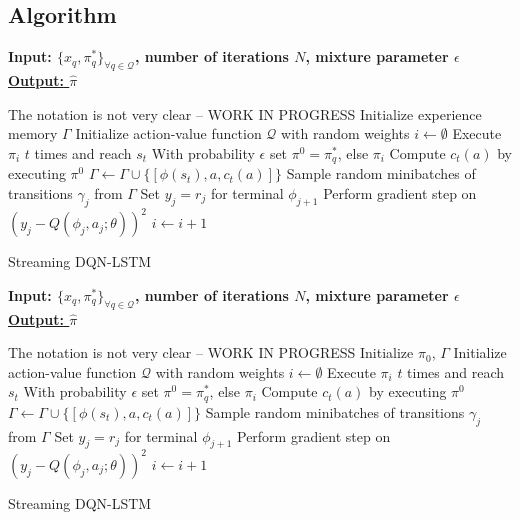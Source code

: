 \documentclass[12pt]{article}
\begin{document}
\subsection{Algorithm}

\begin{algorithm}
    \bf{Input:} { \rm $\{ x_q, \pi^{*}_q \}_{\forall q \in \mathcal{Q} }$, number of iterations $N$, mixture parameter $\epsilon$  } \\
    \underline{\bf{Output:}  $\hat{\pi}$ }
  \begin{algorithmic}[1]
  \STATE The notation is not very clear -- WORK IN PROGRESS
  \STATE \rm Initialize experience memory $\Gamma$
  \STATE \rm Initialize action-value function $\mathcal{Q}$ with random weights
    \STATE \rm $i \leftarrow \emptyset$ 
        \STATE \rm Execute $\pi_i$ $t$ times and reach $s_t$
        		\STATE \rm With probability $\epsilon$ set $\pi^0 = \pi^{*}_q$, else $\pi_i$
		\STATE Compute $c_t(a)$ by executing $\pi^0$
		\STATE $\Gamma \leftarrow \Gamma \cup \{ [\phi(s_t), a, c_t(a)]\}$
		\ENDFOR
        \ENDFOR
        \STATE Sample random minibatches of transitions $\gamma_j$ from $\Gamma$
        \STATE Set $y_j = r_j$ for terminal $\phi_{j+1}$
        \STATE Perform gradient step on $(y_j - Q(\phi_j, a_j; \theta))^2$
        \STATE $i \leftarrow i + 1$
      \ENDFOR
    \ENDFOR
  \end{algorithmic}
    \caption{Streaming DQN-LSTM}
\end{algorithm}


\begin{algorithm}
    \bf{Input:} { \rm $\{ x_q, \pi^{*}_q \}_{\forall q \in \mathcal{Q} }$, number of iterations $N$, mixture parameter $\epsilon$  } \\
    \underline{\bf{Output:}  $\hat{\pi}$ }
  \begin{algorithmic}[1]
  \STATE The notation is not very clear -- WORK IN PROGRESS
  \STATE \rm Initialize $\pi_0$, $\Gamma$
  \STATE \rm Initialize action-value function $\mathcal{Q}$ with random weights
    \STATE \rm $i \leftarrow \emptyset$ 
        \STATE \rm Execute $\pi_i$ $t$ times and reach $s_t$
        		\STATE \rm With probability $\epsilon$ set $\pi^0 = \pi^{*}_q$, else $\pi_i$
		\STATE Compute $c_t(a)$ by executing $\pi^0$
		\STATE $\Gamma \leftarrow \Gamma \cup \{ [\phi(s_t), a, c_t(a)]\}$
		\ENDFOR
        \ENDFOR
        \STATE Sample random minibatches of transitions $\gamma_j$ from $\Gamma$
        \STATE Set $y_j = r_j$ for terminal $\phi_{j+1}$
        \STATE Perform gradient step on $(y_j - Q(\phi_j, a_j; \theta))^2$
        \STATE $i \leftarrow i + 1$
      \ENDFOR
    \ENDFOR
  \end{algorithmic}
    \caption{Streaming DQN-LSTM}
\end{algorithm}
\end{document}
